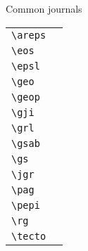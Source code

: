 Common journals
\newline
\begin{tabular}{ll}
\verb"\areps" & \areps{} \\
\verb"\eos"   & \eos{}  \\
\verb"\epsl"  & \epsl{} \\
\verb"\geo"   & \geo{} \\
\verb"\geop"  & \geop{} \\
\verb"\gji"   & \gji{} \\
\verb"\grl"   & \grl{} \\
\verb"\gsab"  & \gsab{} \\
\verb"\gs"    & \gs{} \\
\verb"\jgr"   & \jgr{} \\
\verb"\pag"   & \pag{} \\
\verb"\pepi"  & \pepi{} \\
\verb"\rg"    & \rg{} \\
\verb"\tecto" & \tecto{} \\
\end{tabular}
%
%
